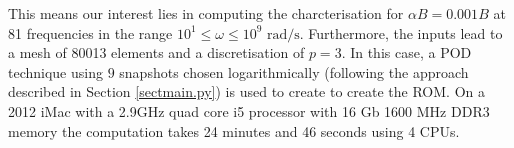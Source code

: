 \noindent
This means our interest lies in computing the charcterisation for $\alpha B=0.001B$ at 81 frequencies in the range $10^1\leq\omega\leq10^9\text{ rad/s}$. Furthermore, the inputs lead to a mesh of 80013 elements and a discretisation of $p=3$. In this case, a POD technique using  $9$ snapshots chosen logarithmically (following the approach described in Section \ref{sectmain.py}) is used  to create to create the ROM. 
On a 2012 iMac with a 2.9GHz quad core i5 processor with 16 Gb 1600 MHz DDR3 memory the computation takes 24 minutes and 46 seconds using 4 CPUs.

